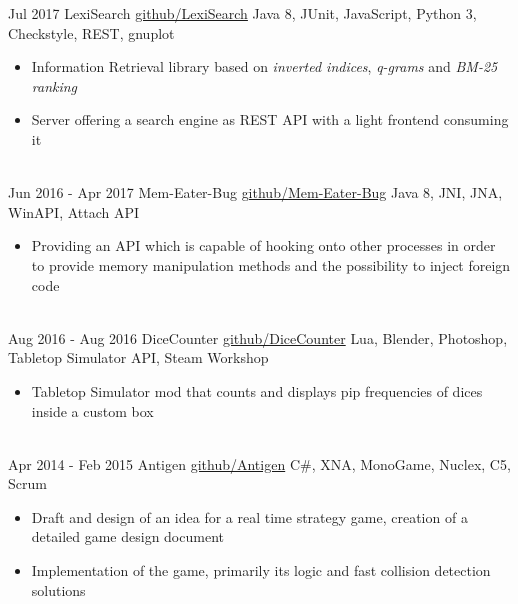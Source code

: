 \documentclass[letterpaper]{twentysecondcv} %
\begin{document}
\begin{twenty}
		{Jul 2017}
        		{LexiSearch}
        		{\href{https://github.com/Zabuzard/LexiSearchExercises}{github/LexiSearch}}
        		{Java 8, JUnit, JavaScript, Python 3, Checkstyle, REST, gnuplot}
        		{\begin{itemize}
        			\item Information Retrieval library based on \textit{inverted indices}, \textit{q-grams} and \textit{BM-25 ranking}
        			\item Server offering a search engine as REST API with a light frontend consuming it
        		\end{itemize}}\\
	\twentyitem
    		{Jun 2016 -}
		{Apr 2017}
        		{Mem-Eater-Bug}
        		{\href{https://github.com/Zabuzard/Mem-Eater-Bug}{github/Mem-Eater-Bug}}
        		{Java 8, JNI, JNA, WinAPI, Attach API}
        		{\begin{itemize}
        			\item Providing an API which is capable of hooking onto other processes in order to provide memory manipulation
        				methods and the possibility to inject foreign code
        		\end{itemize}}\\
	\twentyitem
    		{Aug 2016 -}
		{Aug 2016}
        		{DiceCounter}
        		{\href{https://github.com/Zabuzard/DiceCounter}{github/DiceCounter}}
        		{Lua, Blender, Photoshop, Tabletop Simulator API, Steam Workshop}
        		{\begin{itemize}
        			\item Tabletop Simulator mod that counts and displays pip frequencies of dices inside a custom box
        		\end{itemize}}\\
	\twentyitem
    		{Apr 2014 -}
		{Feb 2015}
        		{Antigen}
        		{\href{https://github.com/Zabuzard/Antigen}{github/Antigen}}
        		{C\#, XNA, MonoGame, Nuclex, C5, Scrum}
        		{\begin{itemize}
        			\item Draft and design of an idea for a real time strategy game, creation of a detailed game design document
        			\item Implementation of the game, primarily its logic and fast collision detection solutions
        		\end{itemize}}
\end{twenty}
\end{document}
